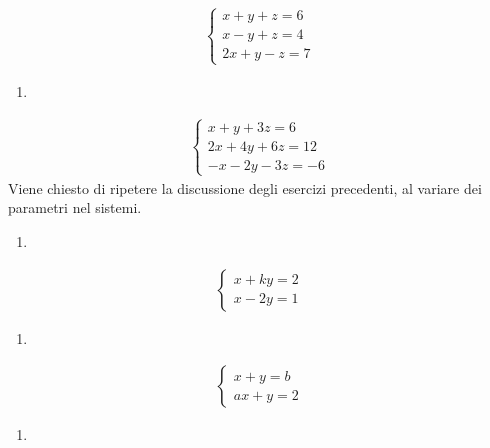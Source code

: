 \documentclass[letterpaper,10pt,italian]{jupyterBook}
\begin{document}
\begin{equation*}
\begin{split}
   \begin{cases}
   x + y + z = 6 \\
   x - y + z = 4 \\
   2x + y - z = 7
   \end{cases}
\end{split}
\end{equation*}\begin{enumerate}
%
\setcounter{enumi}{19}
\item {} 
\end{enumerate}
\begin{equation*}
\begin{split}
    \begin{cases}
    x + y + 3z = 6 \\
    2x + 4y + 6z = 12 \\
    -x - 2y - 3z = -6
    \end{cases}
\end{split}
\end{equation*}
\sphinxAtStartPar
Viene chiesto di ripetere la discussione degli esercizi precedenti, al variare dei parametri nel sistemi.
\begin{enumerate}
%
\item {} 
\end{enumerate}
\begin{equation*}
\begin{split}
   \begin{cases}
   x + ky = 2 \\
   x - 2y = 1
   \end{cases}
\end{split}
\end{equation*}\begin{enumerate}
%
\setcounter{enumi}{1}
\item {} 
\end{enumerate}
\begin{equation*}
\begin{split}
   \begin{cases}
   x + y = b \\
   ax + y = 2
   \end{cases}
\end{split}
\end{equation*}\begin{enumerate}
%
\setcounter{enumi}{2}
\item {} 
\end{enumerate}
\end{document}
